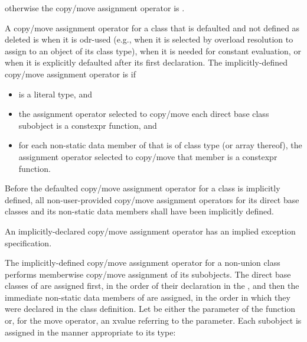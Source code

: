 %
otherwise the copy/move assignment operator is
.

\pnum
{}%
%
A copy/move assignment operator for a class 
that is defaulted and not defined as deleted
is
when it is odr-used
(e.g., when it is selected by overload resolution
to assign to an object of its class type),
when it is needed for constant evaluation, or
when it is explicitly defaulted after its first declaration.
The implicitly-defined copy/move assignment operator is  if
\begin{itemize}
\item
{} is a literal type, and

\item
the assignment operator selected to copy/move each direct base class subobject
is a constexpr function, and

\item
for each non-static data member of  that is of class type (or array
thereof), the assignment operator selected to copy/move that member is a
constexpr function.
\end{itemize}

\pnum
Before the defaulted copy/move assignment operator for a class is
implicitly defined,
all non-user-provided copy/move assignment operators for
its direct base classes and
its non-static data members shall have been implicitly defined.
\begin{note}
An implicitly-declared copy/move assignment operator has an
implied exception specification.
\end{note}

\pnum
The implicitly-defined copy/move assignment operator for a
non-union class  performs memberwise copy/move assignment of its subobjects. The direct
base classes of  are assigned first, in the order of their declaration in the
, and then the immediate non-static data members of
 are assigned, in the order in which they were declared in the class
definition.
Let  be either the parameter of the function or, for the move operator, an
xvalue referring to the parameter.
Each subobject is assigned in the manner appropriate to its type:

